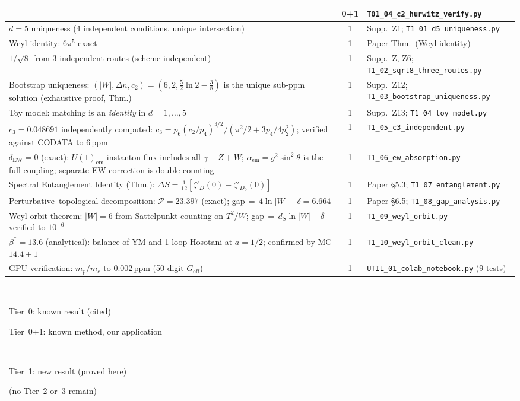 \documentclass[11pt,a4paper]{article}
\begin{document}
\begin{center}
\begin{tabular}{>{\raggedright}p{5.5cm}cp{5.5cm}}
  & 0{+}1 & \texttt{T01\_04\_c2\_hurwitz\_verify.py}\\
\midrule
\rowcolor{tier1}
$d=5$ uniqueness (4 independent conditions, unique intersection)
  & 1 & Supp.\ Z1; \texttt{T1\_01\_d5\_uniqueness.py}\\
\rowcolor{tier1}
Weyl identity: $6\pi^5$ exact
  & 1 & Paper Thm.\ (Weyl identity)\\
\rowcolor{tier1}
$1/\!\sqrt{8}$ from 3 independent routes (scheme-independent)
  & 1 & Supp.\ Z, Z6; \texttt{T1\_02\_sqrt8\_three\_routes.py}\\
\rowcolor{tier1}
Bootstrap uniqueness: $(|W|,\Delta n,c_2)=(6,2,\tfrac52\ln 2-\tfrac38)$
  is the unique sub-ppm solution (exhaustive proof, Thm.)
  & 1 & Supp.\ Z12; \texttt{T1\_03\_bootstrap\_uniqueness.py}\\
\rowcolor{tier1}
Toy model: matching is an \emph{identity} in $d=1,\ldots,5$
  & 1 & Supp.\ Z13; \texttt{T1\_04\_toy\_model.py}\\
\rowcolor{tier1}
$c_3=0.048691$ independently computed:
  $c_3 = p_6(c_2/p_4)^{3/2}/(\pi^2/2 + 3p_4/4p_2^2)$;
  verified against CODATA to 6\,ppm
  & 1 & \texttt{T1\_05\_c3\_independent.py}\\
\rowcolor{tier1}
$\delta_{\mathrm{EW}}=0$ (exact): $U(1)_{\mathrm{em}}$ instanton flux
  includes all $\gamma{+}Z{+}W$; $\alpha_{\mathrm{em}}{=}g^2\sin^2\theta$
  is the full coupling; separate EW correction is double-counting
  & 1 & \texttt{T1\_06\_ew\_absorption.py}\\
\rowcolor{tier1}
Spectral Entanglement Identity (Thm.):
  $\Delta S = \tfrac{1}{12}[\zeta'_D(0)-\zeta'_{D_0}(0)]$
  & 1 & Paper \S 5.3; \texttt{T1\_07\_entanglement.py}\\
\rowcolor{tier1}
Perturbative--topological decomposition:
  $\mathcal{P}=23.397$ (exact); gap$\,{=}\,4\ln|W|-\delta=6.664$
  & 1 & Paper \S 6.5; \texttt{T1\_08\_gap\_analysis.py}\\
\rowcolor{tier1}
Weyl orbit theorem: $|W|{=}6$ from Sattelpunkt-counting
  on $T^2/W$; gap$\,{=}\,d_S\ln|W|-\delta$ verified to $10^{-6}$
  & 1 & \texttt{T1\_09\_weyl\_orbit.py}\\
\rowcolor{tier1}
$\beta^*=13.6$ (analytical): balance of YM and 1-loop
  Hosotani at $a{=}1/2$; confirmed by MC $14.4\pm 1$
  & 1 & \texttt{T1\_10\_weyl\_orbit\_clean.py}\\
\rowcolor{tier1}
GPU verification: $m_p/m_e$ to 0.002\,ppm (50-digit $G_{\mathrm{eff}}$)
  & 1 & \texttt{UTIL\_01\_colab\_notebook.py} (9 tests)\\
\bottomrule
\end{tabular}\\[0.5em]
\colorbox{tier0}{\strut\small\ Tier~0: known result (cited)\ }\quad
\colorbox{tier01}{\strut\small\ Tier~0{+}1: known method, our application\ }\\[0.3em]
\colorbox{tier1}{\strut\small\ Tier~1: new result (proved here)\ }\quad
\colorbox{tier01}{\strut\small\ (no Tier~2 or~3 remain)\ }
\end{center}
\end{document}
